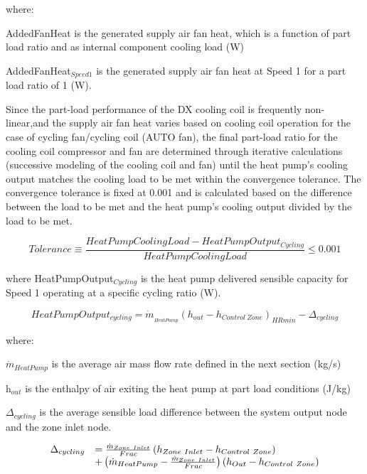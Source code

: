 where:

AddedFanHeat is the generated supply air fan heat, which is a function of part load ratio and as internal component cooling load (W)

AddedFanHeat\(_{Speed1}\) is the generated supply air fan heat at Speed 1 for a part load ratio of 1 (W).

Since the part-load performance of the DX cooling coil is frequently non-linear,and the supply air fan heat varies based on cooling coil operation for the case of cycling fan/cycling coil (AUTO fan), the final part-load ratio for the cooling coil compressor and fan are determined through iterative calculations (successive modeling of the cooling coil and fan) until the heat pump's cooling output matches the cooling load to be met within the convergence tolerance. The convergence tolerance is fixed at 0.001 and is calculated based on the difference between the load to be met and the heat pump's cooling output divided by the load to be met.

\begin{equation}
  Tolerance \equiv \frac{HeatPumpCoolingLoad - HeatPumpOutput_{Cycling}}{HeatPumpCoolingLoad} \leq 0.001
\end{equation}

where HeatPumpOutput\(_{Cycling}\) is the heat pump delivered sensible capacity for Speed 1 operating at a specific cycling ratio (W).

\begin{equation}
HeatPumpOutpu{t_{cycling}} = {\dot m_{_{HeatPump}}}{\left( {{h_{out}} - {h_{Control~Zone}}} \right)_{HRmin}} - {\Delta_{cycling}}
\end{equation}

where:

\({\dot m_{HeatPump}}\) is the average air mass flow rate defined in the next section (kg/s)

h\(_{out}\) is the enthalpy of air exiting the heat pump at part load conditions (J/kg)

\(\Delta_{cycling}\) is the average sensible load difference between the system output node and the zone inlet node.

\begin{equation}
  \begin{array}{rl}
    \Delta_{cycling} &= \frac{\dot{m}_{Zone~Inlet}}{Frac} \left(h_{Zone~Inlet}-h_{Control~Zone}\right) \\
                           &+ \left(\dot{m}_{HeatPump} - \frac{\dot{m}_{Zone~Inlet}}{Frac}\right) \left(h_{Out} - h_{Control~Zone}\right)
  \end{array}
\end{equation}

